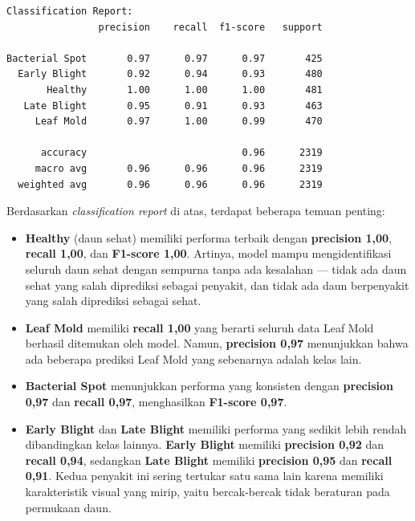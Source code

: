 \begin{outputcode}[H]
\begin{lstlisting}[language={}]
Classification Report:
                precision    recall  f1-score   support

Bacterial Spot       0.97      0.97      0.97       425
  Early Blight       0.92      0.94      0.93       480
       Healthy       1.00      1.00      1.00       481
   Late Blight       0.95      0.91      0.93       463
     Leaf Mold       0.97      1.00      0.99       470

      accuracy                           0.96      2319
     macro avg       0.96      0.96      0.96      2319
  weighted avg       0.96      0.96      0.96      2319
\end{lstlisting}
\caption{Output classification report model ResNet9}
\end{outputcode}

Berdasarkan \textit{classification report} di atas, terdapat beberapa temuan penting:

\begin{itemize}
    \item \textbf{Healthy} (daun sehat) memiliki performa terbaik dengan \textbf{precision 1,00}, \textbf{recall 1,00}, dan \textbf{F1-score 1,00}. Artinya, model mampu mengidentifikasi seluruh daun sehat dengan sempurna tanpa ada kesalahan --- tidak ada daun sehat yang salah diprediksi sebagai penyakit, dan tidak ada daun berpenyakit yang salah diprediksi sebagai sehat.
    \item \textbf{Leaf Mold} memiliki \textbf{recall 1,00} yang berarti seluruh data Leaf Mold berhasil ditemukan oleh model. Namun, \textbf{precision 0,97} menunjukkan bahwa ada beberapa prediksi Leaf Mold yang sebenarnya adalah kelas lain.
    \item \textbf{Bacterial Spot} menunjukkan performa yang konsisten dengan \textbf{precision 0,97} dan \textbf{recall 0,97}, menghasilkan \textbf{F1-score 0,97}.
    \item \textbf{Early Blight} dan \textbf{Late Blight} memiliki performa yang sedikit lebih rendah dibandingkan kelas lainnya. \textbf{Early Blight} memiliki \textbf{precision 0,92} dan \textbf{recall 0,94}, sedangkan \textbf{Late Blight} memiliki \textbf{precision 0,95} dan \textbf{recall 0,91}. Kedua penyakit ini sering tertukar satu sama lain karena memiliki karakteristik visual yang mirip, yaitu bercak-bercak tidak beraturan pada permukaan daun.
\end{itemize}


